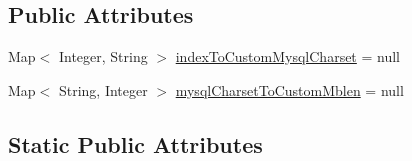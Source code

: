 \subsection*{Public Attributes}
\begin{DoxyCompactItemize}
\item 
Map$<$ Integer, String $>$ \mbox{\hyperlink{classcom_1_1mysql_1_1cj_1_1protocol_1_1a_1_1_native_server_session_a05bb96d23cfc48cd8c3330bcf72bce21}{index\+To\+Custom\+Mysql\+Charset}} = null
\item 
Map$<$ String, Integer $>$ \mbox{\hyperlink{classcom_1_1mysql_1_1cj_1_1protocol_1_1a_1_1_native_server_session_ae2143cf09383039fb6cc598e5a80bd38}{mysql\+Charset\+To\+Custom\+Mblen}} = null
\end{DoxyCompactItemize}
\subsection*{Static Public Attributes}
